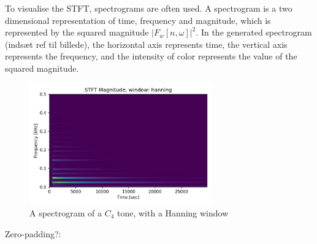 To visualise the STFT, spectrograms are often used. A spectrogram is a two dimensional representation of time, frequency and magnitude, which is represented by the squared magnitude $ |F_w[n,\omega]|^2$.
In the generated spectrogram (indsæt ref til billede), the horizontal axis represents time, the vertical axis represents the frequency, and the intensity of color represents the value of the squared magnitude. 
\\
\begin{figure}[H]
    \centering
    \includegraphics[width=0.7\textwidth]{figures/spectrogramC4['hanning'].jpg}
    \caption{A spectrogram of a $C_4$ tone, with a Hanning window }
    \label{fig: spectrogram_of_C4}
\end{figure}
Zero-padding?: